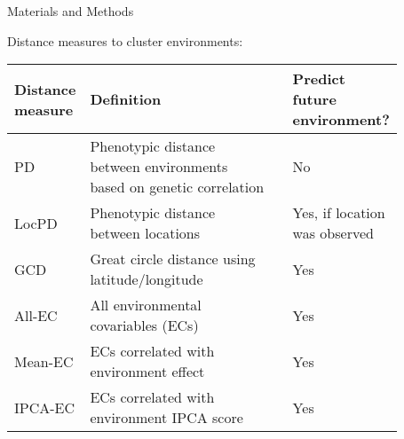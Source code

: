 \documentclass[final]{beamer}
\newlength{\sepwid}
\newlength{\onecolwid}
\newlength{\twocolwid}
\begin{document}
\begin{frame}[t]
\begin{columns}[t]
\begin{column}{\onecolwid}
\begin{block}{Materials and Methods}
\begin{footnotesize}
\end{footnotesize}


\vspace{1cm}


Distance measures to cluster environments:

\vspace{-0.5cm}

\begin{scriptsize}
\begin{table}[h]
\centering
\begin{tabular}{p{0.15\linewidth} p{0.58\linewidth} p{0.01\linewidth} p{0.21\linewidth}} 
\toprule
\textbf{Distance measure} & \textbf{Definition} & & \textbf{Predict future environment?}\\
\midrule
PD & Phenotypic distance between environments based on genetic correlation \cite{Ouyang1995} & & No \\
LocPD & Phenotypic distance between locations & & Yes, if location was observed\\
GCD & Great circle distance using latitude/longitude & & Yes\\
All-EC & All environmental covariables (ECs) & & Yes\\
Mean-EC & ECs correlated with environment effect & & Yes\\
IPCA-EC & ECs correlated with environment IPCA score & & Yes\\
\bottomrule
\end{tabular}
\end{table}
\end{scriptsize}







\end{block}



\end{column} %

\begin{column}{\sepwid}\end{column} %

\begin{column}{\twocolwid} %


%   


\end{column}
\end{columns}
\end{frame}
\end{document}
